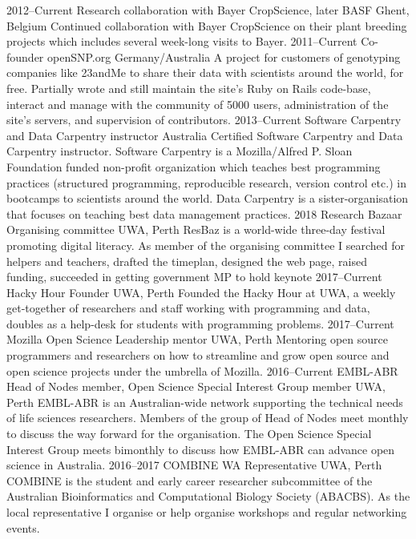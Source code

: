 \documentclass[]{friggeri-cv} %
\begin{document}
\begin{entrylist}
\entry
{2012--Current}
{Research collaboration with Bayer CropScience, later BASF}
{Ghent, Belgium}
{Continued collaboration with Bayer CropScience on their plant breeding projects which includes several week-long visits to Bayer.}
\entry
{2011--Current}
{Co-founder openSNP.org}
{Germany/Australia}
{A project for customers of genotyping companies like 23andMe to share their data with scientists around the world, for free. Partially wrote and still maintain the site's Ruby on Rails code-base, interact and manage with the community of 5000 users, administration of the site's servers, and supervision of contributors.}
\entry
{2013--Current}
{Software Carpentry and Data Carpentry instructor}
{Australia}
{Certified Software Carpentry and Data Carpentry instructor. Software Carpentry is a Mozilla/Alfred P. Sloan Foundation funded non-profit organization which teaches best programming practices (structured programming, reproducible research, version control etc.) in bootcamps to scientists around the world. Data Carpentry is a sister-organisation that focuses on teaching best data management practices.}
\entry
{2018}
{Research Bazaar Organising committee}
{UWA, Perth}
{ResBaz is a world-wide three-day festival promoting digital literacy. As member of the organising committee I searched for helpers and teachers, drafted the timeplan, designed the web page, raised funding, succeeded in getting government MP to hold keynote}
\entry
{2017--Current}
{Hacky Hour Founder}
{UWA, Perth}
{Founded the Hacky Hour at UWA, a weekly get-together of researchers and staff working with programming and data, doubles as a help-desk for students with programming problems.}
\entry
{2017--Current}
{Mozilla Open Science Leadership mentor}
{UWA, Perth}
{Mentoring open source programmers and researchers on how to streamline and grow open source and open science projects under the umbrella of Mozilla.}
\entry
{2016--Current}
{EMBL-ABR Head of Nodes member, Open Science Special Interest Group member}
{UWA, Perth}
{EMBL-ABR is an Australian-wide network supporting the technical needs of life sciences researchers. Members of the group of Head of Nodes meet monthly to discuss the way forward for the organisation. The Open Science Special Interest Group meets bimonthly to discuss how EMBL-ABR can advance open science in Australia.}
\entry
{2016--2017}
{COMBINE WA Representative}
{UWA, Perth}
{COMBINE is the student and early career researcher subcommittee of the Australian Bioinformatics and Computational Biology Society (ABACBS). As the local representative I organise or help organise workshops and regular networking events.}
\end{entrylist}
\end{document}
